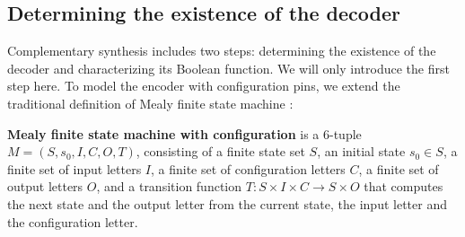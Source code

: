 \documentclass[journal]{IEEEtran}
\begin{document}

%
%
%





\subsection{Determining the existence of the decoder}\label{subsec_chkextdec}
Complementary synthesis\cite{ShengYuShen:iccad09} includes two steps:
determining the existence of the decoder and characterizing its Boolean function.
We will only introduce the first step here.
To model the encoder with configuration pins,
we extend the traditional definition of Mealy finite state machine \cite{MEALY}:

\begin{definition11}\label{MealyFSM}%
\textbf{Mealy finite state machine with configuration} is a 6-tuple $M=(S,s_0,I,C,O,T)$,
consisting of a finite state set $S$,
an initial state $s_0\in S$,
a finite set of input letters $I$,
a finite set of configuration letters $C$,
a finite set of output letters $O$,
and a transition function $T: S\times I\times C\to S\times O$ that computes the next state
and the output letter from the current state,
the input letter and the configuration letter.
\end{definition11}
\end{document}
